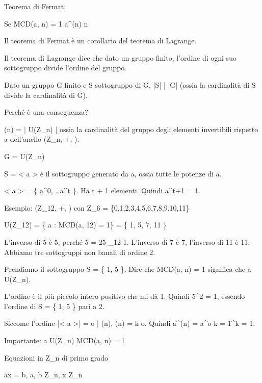 Teorema di Fermat:

Se MCD(a, n) = 1 \Rightarrow a^{\Phi(n)}  \pmod n

Il teorema di Fermat \`e un corollario del teorema di Lagrange.

Il teorema di Lagrange dice che dato un gruppo finito, l'ordine di ogni suo sottogruppo divide l'ordine del gruppo.

Dato un gruppo G finito e S sottogruppo di G, |S| | |G| (ossia la cardinalit\`a di S divide la cardinalit\`a di G).

Perch\'e \`e una conseguenza? 

\Phi(n) = | U(Z_n) | ossia la cardinalit\`a del gruppo degli elementi invertibili rispetto a \cdot dell'anello (Z_n, +, \cdot).

G = U(Z_n)

S = < a > \`e il sottogruppo generato da a, ossia tutte le potenze di a.

< a > = \{ a^0, \dots a^t \}. Ha t + 1 elementi. Quindi a^{t+1} = 1.

Esempio:
(Z_12, +, \cdot) con Z_6 = \{0,1,2,3,4,5,6,7,8,9,10,11\}

U(Z_12) = \{ a : MCD(a, 12) = 1\} = \{ 1, 5, 7, 11 \}

L'inverso di 5 \`e 5, perch\'e 5  = 25 \equiv_{12} 1. L'inverso di 7 \`e 7, l'inverso di 11 \`e 11. Abbiamo tre sottogruppi non banali di ordine 2.

Prendiamo il sottogruppo S = \{ 1, 5 \}. Dire che MCD(a, n) = 1 significa che a \in U(Z_n).

L'ordine \`e il pi\`u piccolo intero positivo che mi d\`a 1. Quindi 5^2 = 1, essendo l'ordine di S = \{ 1, 5 \} pari a 2.

Siccome l'ordine |< a >| = o | \Phi(n), \Phi(n) = k \cdot o. Quindi a^{\Phi(n)} = a^{o \cdot k} = 1^k = 1.

Importante: a \in U(Z_n) \Leftrightarrow MCD(a, n) = 1

Equazioni in Z_n di primo grado

ax = b, a, b \in Z_n, x \in Z_n

